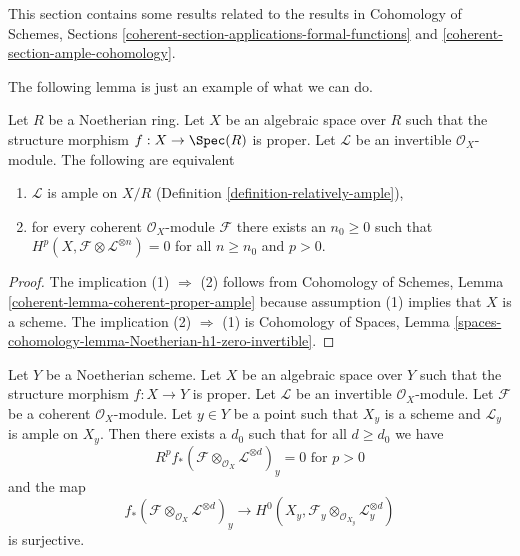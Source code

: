 \noindent
This section contains some results related to the results
in Cohomology of Schemes, Sections
\ref{coherent-section-applications-formal-functions} and
\ref{coherent-section-ample-cohomology}.

\medskip\noindent
The following lemma is just an example of what we can do.

\begin{lemma}
\label{lemma-vanshing-gives-ample}
Let $R$ be a Noetherian ring. Let $X$ be an algebraic space over $R$
such that the structure morphism $f : X \to \Spec(R)$ is proper.
Let $\mathcal{L}$ be an invertible $\mathcal{O}_X$-module.
The following are equivalent
\begin{enumerate}
\item $\mathcal{L}$ is ample on $X/R$
(Definition \ref{definition-relatively-ample}),
\item for every coherent $\mathcal{O}_X$-module $\mathcal{F}$
there exists an $n_0 \geq 0$ such that
$H^p(X, \mathcal{F} \otimes \mathcal{L}^{\otimes n}) = 0$
for all $n \geq n_0$ and $p > 0$.
\end{enumerate}
\end{lemma}

\begin{proof}
The implication (1) $\Rightarrow$ (2) follows from
Cohomology of Schemes, Lemma \ref{coherent-lemma-coherent-proper-ample}
because assumption (1) implies that $X$ is a scheme.
The implication (2) $\Rightarrow$ (1) is
Cohomology of Spaces, Lemma
\ref{spaces-cohomology-lemma-Noetherian-h1-zero-invertible}.
\end{proof}

\begin{lemma}
\label{lemma-ample-on-fibre}
Let $Y$ be a Noetherian scheme. Let $X$ be an algebraic space over $Y$
such that the structure morphism $f : X \to Y$ is proper.
Let $\mathcal{L}$ be an invertible $\mathcal{O}_X$-module.
Let $\mathcal{F}$ be a coherent $\mathcal{O}_X$-module.
Let $y \in Y$ be a point such that $X_y$ is a scheme and
$\mathcal{L}_y$ is ample on $X_y$.
Then there exists a $d_0$ such that for all $d \geq d_0$ we have
$$
R^pf_*(\mathcal{F} \otimes_{\mathcal{O}_X} \mathcal{L}^{\otimes d})_y = 0
\text{ for }p > 0
$$
and the map
$$
f_*(\mathcal{F} \otimes_{\mathcal{O}_X} \mathcal{L}^{\otimes d})_y
\longrightarrow
H^0(X_y, \mathcal{F}_y \otimes_{\mathcal{O}_{X_y}} \mathcal{L}_y^{\otimes d})
$$
is surjective.
\end{lemma}

